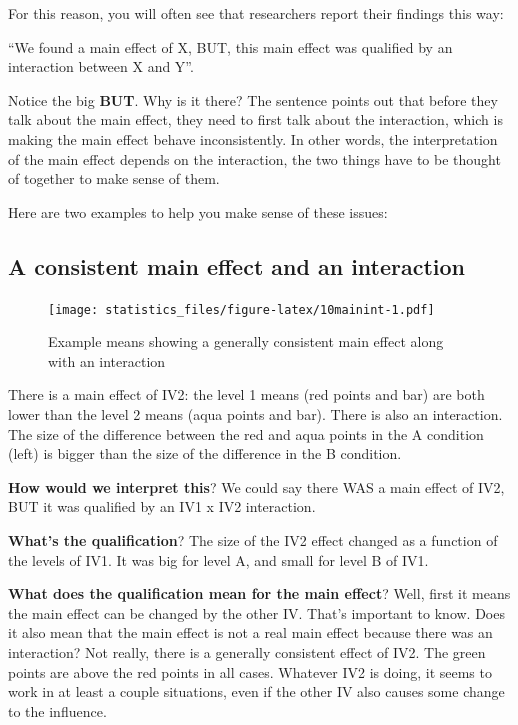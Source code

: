 \documentclass[]{book}
\begin{document}
For this reason, you will often see that researchers report their findings this way:

``We found a main effect of X, BUT, this main effect was qualified by an interaction between X and Y''.

Notice the big \textbf{BUT}. Why is it there? The sentence points out that before they talk about the main effect, they need to first talk about the interaction, which is making the main effect behave inconsistently. In other words, the interpretation of the main effect depends on the interaction, the two things have to be thought of together to make sense of them.

Here are two examples to help you make sense of these issues:

\hypertarget{a-consistent-main-effect-and-an-interaction}{%
\subsection{A consistent main effect and an interaction}\label{a-consistent-main-effect-and-an-interaction}}

\begin{figure}
\centering
\texttt{[image: statistics\_files/figure-latex/10mainint-1.pdf]}
\caption{\label{fig:10mainint}Example means showing a generally consistent main effect along with an interaction}
\end{figure}

There is a main effect of IV2: the level 1 means (red points and bar) are both lower than the level 2 means (aqua points and bar). There is also an interaction. The size of the difference between the red and aqua points in the A condition (left) is bigger than the size of the difference in the B condition.

\textbf{How would we interpret this}? We could say there WAS a main effect of IV2, BUT it was qualified by an IV1 x IV2 interaction.

\textbf{What's the qualification}? The size of the IV2 effect changed as a function of the levels of IV1. It was big for level A, and small for level B of IV1.

\textbf{What does the qualification mean for the main effect}? Well, first it means the main effect can be changed by the other IV. That's important to know. Does it also mean that the main effect is not a real main effect because there was an interaction? Not really, there is a generally consistent effect of IV2. The green points are above the red points in all cases. Whatever IV2 is doing, it seems to work in at least a couple situations, even if the other IV also causes some change to the influence.
\end{document}
